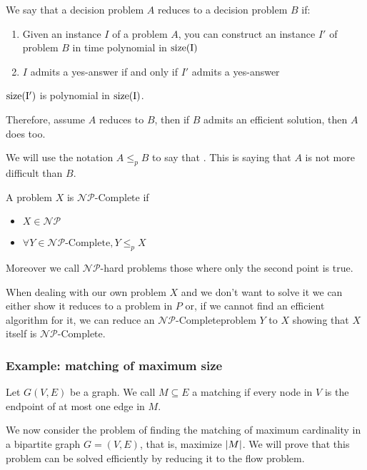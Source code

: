 \documentclass[12pt]{extarticle}
\newcommand{\NP}{{\mathcal{NP}}}
\newcommand{\NPC}{$\NP$-Complete}
\newcommand{\reducesto}{\leq_p}
\begin{document}
We say that a decision problem $A$ reduces to a decision problem $B$ if:
\begin{enumerate}[label=\roman*.]
    \item Given an instance $I$ of a problem $A$, you can construct an instance $I'$ of problem $B$ in time polynomial in $\operatorfont{size}(I)$
    \item $I$ admits a yes-answer if and only if $I'$ admits a yes-answer
\end{enumerate}

\begin{remark}
    $\operatorfont{size}(I')$ is polynomial in $\operatorfont{size}(I)$.
\end{remark}

Therefore, assume $A$ reduces to $B$, then if $B$ admits an efficient solution, then $A$ does too.

We will use the notation $A \reducesto B$ to say that . This is saying that $A$ is not more difficult than $B$.

\begin{definition}[\NPC{} problem]
    A problem $X$ is \NPC{} if
    \begin{itemize}
        \item $X \in \NP$
        \item $\forall Y \in \text{\NPC}, Y \reducesto X$
    \end{itemize}

    Moreover we call $\NP$-hard problems those where only the second point is true.
\end{definition}

When dealing with our own problem $X$ and we don't want to solve it we can either show it reduces to a problem in $P$ or, if we cannot find an efficient algorithm for it, we can reduce an \NPC problem $Y$ to $X$ showing that $X$ itself is \NPC.

\subsubsection{Example: matching of maximum size}

\begin{definition}[matching]
    Let $G(V, E)$ be a graph.
    We call $M \subseteq E$ a matching if every node in $V$ is the endpoint of at most one edge in $M$.
\end{definition}

We now consider the problem of finding the matching of maximum cardinality in a bipartite graph $G = (V,E)$, that is, maximize $\abs{M}$.
We will prove that this problem can be solved efficiently by reducing it to the flow problem.
\end{document}
